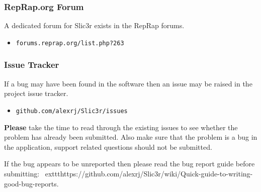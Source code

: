 \subsubsection{RepRap.org Forum} %
\label{sub:reprap_org_forum}


A dedicated forum for Slic3r exists in the RepRap forums.
\begin{itemize}
    \item \texttt{forums.reprap.org/list.php?263}
\end{itemize}


\subsubsection{Issue Tracker} %
\label{sub:issue_tracker}

If a bug may have been found in the software then an issue may be raised in the project issue tracker.

\begin{itemize}
    \item \texttt{github.com/alexrj/Slic3r/issues}
\end{itemize}

\textbf{Please} take the time to read through the existing issues to see whether the problem has already been submitted.  Also make sure that the problem is a bug in the application, support related questions should not be submitted.

If the bug appears to be unreported then please read the bug report guide before submitting: \	exttt{https://github.com/alexrj/Slic3r/wiki/Quick-guide-to-writing-good-bug-reports}.


